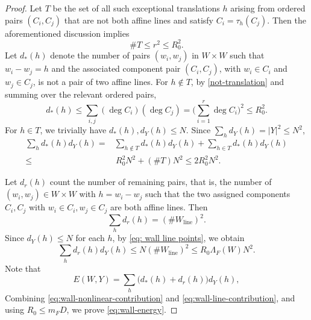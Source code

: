 \documentclass[10pt,a4paper]{amsart}
\begin{document}
\begin{proof}
Let $T$ be the set of all such exceptional translations $h$ arising from ordered pairs $(C_i,C_j)$ that are not both affine lines and satisfy $C_i=\tau_h(C_j)$.
Then the aforementioned discussion implies
\[
    \#T\leq r^2\leq R_0^2.
\]
Let $d_*(h)$ denote the number of pairs $(w_i,w_j)$ in $W\times W$ such that $w_i-w_j=h$ and the associated component pair $(C_i,C_j)$, with $w_i\in C_i$ and $w_j\in C_j$, is not a pair of two affine lines.
For $h\notin T$, by \eqref{not-translation} and summing over the relevant ordered pairs, 
\[
    d_*(h)\leq \sum_{i,j}(\deg C_i)(\deg C_j)=\Big(\sum_{i=1}^r\deg C_i\Big)^2\leq R_0^2.
\]
For $h\in T$, we trivially have $d_*(h),d_{Y}(h)\leq N$. Since $\sum_hd_{Y}(h)=|Y|^2\leq N^2$, 
\begin{align}
\nonumber
    \sum_h d_*(h)d_{Y}(h)=&\sum_{h\not\in T} d_*(h)d_{Y}(h)+\sum_{h \in T} d_*(h)d_{Y}(h)\\  \label{eq:wall-nonlinear-contribution}
    \leq &\, R_0^2N^2+(\#T)N^2\leq 2R_0^2N^2.
\end{align}

Let $d_{r}(h)$ count the number of remaining pairs, that is, the number of $(w_i,w_j)\in W\times W$ with $h=w_i-w_j$ such that the two assigned components $C_i, C_j$ with $w_i\in C_i, w_j\in C_j$ are both affine lines.
Then
\[
    \sum_h d_{r}(h)=(\#W_{\mathrm{line}})^2.
\]
Since $d_{Y}(h)\leq N$ for each $h$, by \eqref{eq: wall line points}, we obtain
\begin{equation}
\label{eq:wall-line-contribution}
    \sum_h d_{r}(h)d_{Y}(h) \leq N(\#W_{\mathrm{line}})^2
    \leq R_0\Lambda_{ F}(W) N^2.
\end{equation}
Note that
\[
    E(W,Y)=\sum_h\bigl(d_*(h)+d_{r}(h)\bigr)d_{Y}(h),
\]
Combining \eqref{eq:wall-nonlinear-contribution} and
\eqref{eq:wall-line-contribution}, and using $R_0\leq m_FD$, we prove \eqref{eq:wall-energy}.
\end{proof}
\end{document}
